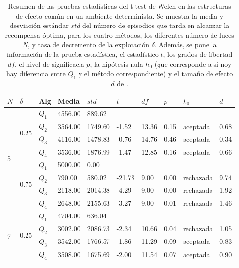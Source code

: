 \begin{table}[]
\centering
\caption{Resumen de las pruebas estadísticas del t-test de Welch en las
estructuras de efecto común en un ambiente determinista. Se muestra la media y desviación estándar $std$ del número 
de episodios que tarda en alcanzar la recompensa óptima, para los cuatro métodos, los diferentes número de luces $N$, y tasa de decremento de la exploración $\delta$. Además, se pone la información
de la prueba estadística, el estadístico $t$, los grados de libertad $df$, el nivel
de significacia $p$, la hipótesis nula $h_0$ (que corresponde a si noy hay diferencia entre $Q_1$ y el método correspondiente) y el tamaño de efecto $d$ de \citet{cohen2013statistical}.}
\label{tab:common-effect-one-to-one-delta-det}
\begin{tabular}{|l|l|l|l|l|l|l|l|l|l|}
\hline
$N$ & $\delta$ & Alg & Media & $std$ & $t$ & $df$ & $p$ & $h_0$ & $d$ \\ \hline
\multirow{8}{*}{5} & \multirow{4}{*}{0.25} & $Q_1$ & 4556.00 & 889.62 & \multicolumn{5}{l|}{} \\ \cline{3-10} 
 &  & $Q_2$ & 3564.00 & 1749.60 & -1.52 & 13.36 & 0.15 & aceptada & 0.68 \\ \cline{3-10} 
 &  & $Q_3$ & 4116.00 & 1478.83 & -0.76 & 14.76 & 0.46 & aceptada & 0.34 \\ \cline{3-10} 
 &  & $Q_4$ & 3536.00 & 1876.99 & -1.47 & 12.85 & 0.16 & aceptada & 0.66 \\ \cline{2-10} 
 & \multirow{4}{*}{0.75} & $Q_1$ & 5000.00 & 0.00 & \multicolumn{5}{l|}{} \\ \cline{3-10} 
 &  & $Q_2$ & 790.00 & 580.02 & -21.78 & 9.00 & 0.00 & rechazada & 9.74 \\ \cline{3-10} 
 &  & $Q_3$ & 2118.00 & 2014.38 & -4.29 & 9.00 & 0.00 & rechazada & 1.92 \\ \cline{3-10} 
 &  & $Q_4$ & 2648.00 & 2155.63 & -3.27 & 9.00 & 0.01 & rechazada & 1.46 \\ \hline
\multirow{8}{*}{7} & \multirow{4}{*}{0.25} & $Q_1$ & 4704.00 & 636.04 & \multicolumn{5}{l|}{} \\ \cline{3-10} 
 &  & $Q_2$ & 3002.00 & 2086.73 & -2.34 & 10.66 & 0.04 & rechazada & 1.05 \\ \cline{3-10} 
 &  & $Q_3$ & 3542.00 & 1766.57 & -1.86 & 11.29 & 0.09 & aceptada & 0.83 \\ \cline{3-10} 
 &  & $Q_4$ & 3508.00 & 1675.69 & -2.00 & 11.54 & 0.07 & aceptada & 0.90 \\ \cline{2-10} 

\end{tabular}
\end{table}
